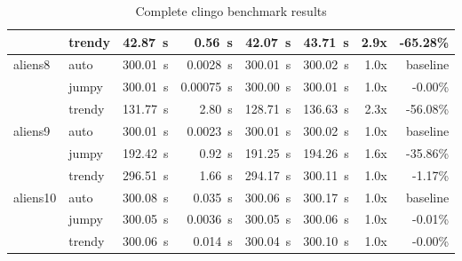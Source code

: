 \documentclass[11pt]{article}
\begin{document}
\begin{table}[h]
\begin{tabular}{|llrrrrrr|}
    & trendy & 42.87~s & 0.56~s & 42.07~s & 43.71~s & 2.9x & -65.28\% \\
    \hline
    aliens8 & auto & 300.01~s & 0.0028~s & 300.01~s & 300.02~s & 1.0x & baseline \\
    & jumpy & 300.01~s & 0.00075~s & 300.00~s & 300.01~s & 1.0x & -0.00\% \\
    & trendy & 131.77~s & 2.80~s & 128.71~s & 136.63~s & 2.3x & -56.08\% \\
    \hline
    aliens9 & auto & 300.01~s & 0.0023~s & 300.01~s & 300.02~s & 1.0x & baseline \\
    & jumpy & 192.42~s & 0.92~s & 191.25~s & 194.26~s & 1.6x & -35.86\% \\
    & trendy & 296.51~s & 1.66~s & 294.17~s & 300.11~s & 1.0x & -1.17\% \\
    \hline
    aliens10 & auto & 300.08~s & 0.035~s & 300.06~s & 300.17~s & 1.0x & baseline \\
    & jumpy & 300.05~s & 0.0036~s & 300.05~s & 300.06~s & 1.0x & -0.01\% \\
    & trendy & 300.06~s & 0.014~s & 300.04~s & 300.10~s & 1.0x & -0.00\% \\
    \hline
  \end{tabular}
  \caption{Complete clingo benchmark results}
  \label{table:clingo-bench-comparative}
\end{table}
\end{document}
